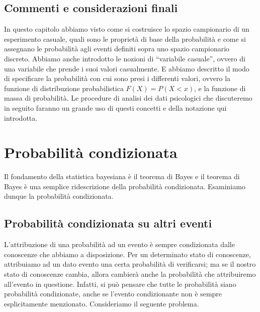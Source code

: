 \documentclass[
  11pt,
]{krantz}
\theoremstyle{definition}
\theoremstyle{definition}
\theoremstyle{definition}
\theoremstyle{definition}
\theoremstyle{remark}
\begin{document}
\hypertarget{commenti-e-considerazioni-finali}{%
\section*{Commenti e considerazioni finali}\label{commenti-e-considerazioni-finali}}


In questo capitolo abbiamo visto come si costruisce lo spazio campionario di un esperimento casuale, quali sono le proprietà di base della probabilità e come si assegnano le probabilità agli eventi definiti sopra uno spazio campionario discreto. Abbiamo anche introdotto le nozioni di ``variabile casuale'', ovvero di una variabile che prende i suoi valori casualmente. E abbiamo descritto il modo di specificare la probabilità con cui sono presi i differenti valori, ovvero la funzione di distribuzione probabilistica \(F(X) = P(X < x)\), e la funzione di massa di probabilità. Le procedure di analisi dei dati psicologici che discuteremo in seguito faranno un grande uso di questi concetti e della notazione qui introdotta.

\hypertarget{chapter-prob-cond}{%
\chapter{Probabilità condizionata}\label{chapter-prob-cond}}

Il fondamento della statistica bayesiana è il teorema di Bayes e il teorema di Bayes è una semplice ridescrizione della probabilità condizionata. Esaminiamo dunque la probabilità condizionata.

\hypertarget{sec:bayes-cancer}{%
\section{Probabilità condizionata su altri eventi}\label{sec:bayes-cancer}}

L'attribuzione di una probabilità ad un evento è sempre condizionata dalle conoscenze che abbiamo a disposizione. Per un determinato stato di conoscenze, attribuiamo ad un dato evento una certa probabilità di verificarsi; ma se il nostro stato di conoscenze cambia, allora cambierà anche la probabilità che attribuiremo all'evento in questione. Infatti, si può pensare che tutte le probabilità siano probabilità condizionate, anche se l'evento condizionante non è sempre esplicitamente menzionato. Consideriamo il seguente problema.
\end{document}
